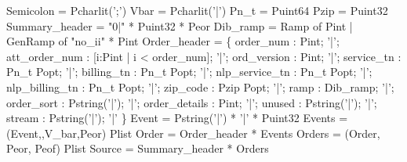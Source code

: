  Semicolon = Pcharlit(';')
 Vbar = Pcharlit('|')
\mbox{}
 Pn\_t = Puint64
 Pzip = Puint32
\mbox{}
 Summary\_header = "0|" * Puint32 * Peor
\mbox{}
 Dib\_ramp = 
  Ramp of Pint 
| GenRamp of "no\_ii" * Pint
\mbox{}
 Order\_header = \{ 
    order\_num : Pint;  
'|'; att\_order\_num : [i:Pint | i < order\_num];  
'|'; ord\_version : Pint;  
'|'; service\_tn : Pn\_t Popt;
'|'; billing\_tn : Pn\_t Popt;  
'|'; nlp\_service\_tn : Pn\_t Popt;  
'|'; nlp\_billing\_tn : Pn\_t Popt;  
'|'; zip\_code : Pzip Popt;  
'|'; ramp : Dib\_ramp;  
'|'; order\_sort : Pstring('|');  
'|'; order\_details : Pint;
'|'; unused : Pstring('|');  
'|'; stream : Pstring('|'); 
'|'
\} 
\mbox{}
 Event  = Pstring('|') * '|' * Puint32
 Events = (Event,,V_bar,Peor) Plist
\mbox{}
 Order  = Order\_header * Events
 Orders = (Order, Peor, Peof) Plist
\mbox{}
 Source = Summary\_header * Orders
